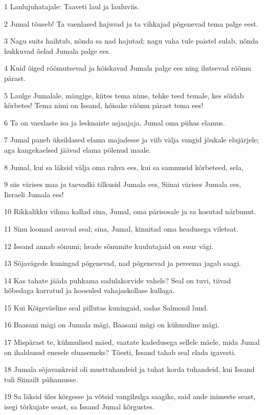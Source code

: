 \par 1 Laulujuhatajale: Taaveti laul ja lauluviis.
\par 2 Jumal tõuseb! Ta vaenlased hajuvad ja ta vihkajad põgenevad tema palge eest.
\par 3 Nagu suits haihtub, nõnda sa nad hajutad; nagu vaha tule paistel sulab, nõnda hukkuvad õelad Jumala palge ees.
\par 4 Kuid õiged rõõmutsevad ja hõiskavad Jumala palge ees ning ilutsevad rõõmu pärast.
\par 5 Laulge Jumalale, mängige, kiites tema nime, tehke teed temale, kes sõidab kõrbetes! Tema nimi on Issand, hõisake rõõmu pärast tema ees!
\par 6 Ta on vaeslaste isa ja lesknaiste asjaajaja, Jumal oma pühas elamus.
\par 7 Jumal paneb üksildased elama majadesse ja viib välja vangid jõukale elujärjele; aga kangekaelsed jäävad elama põlenud maale.
\par 8 Jumal, kui sa läksid välja oma rahva ees, kui sa sammusid kõrbeteed, sela,
\par 9 siis värises maa ja taevadki tilkusid Jumala ees, Siinai värises Jumala ees, Iisraeli Jumala ees!
\par 10 Rikkalikku vihma kallad sina, Jumal, oma pärisosale ja sa kosutad närbunut.
\par 11 Sinu loomad asuvad seal; sina, Jumal, kinnitad oma headusega viletsat.
\par 12 Issand annab sõnumi; heade sõnumite kuulutajaid on suur vägi.
\par 13 Sõjavägede kuningad põgenevad, nad põgenevad ja pereema jagab saagi.
\par 14 Kas tahate jääda puhkama sadulakorvide vahele? Seal on tuvi, tiivad hõbedaga karratud ja hoosuled vahajaskollase kullaga.
\par 15 Kui Kõigeväeline seal pillutas kuningaid, sadas Salmonil lund.
\par 16 Baasani mägi on Jumala mägi, Baasani mägi on kühmuline mägi.
\par 17 Mispärast te, kühmulised mäed, vaatate kadedusega sellele mäele, mida Jumal on ihaldanud enesele eluasemeks? Tõesti, Issand tahab seal elada igavesti.
\par 18 Jumala sõjavankreid oli musttuhandeid ja tuhat korda tuhandeid, kui Issand tuli Siinailt pühamusse.
\par 19 Sa läksid üles kõrgesse ja võtsid vangihulga saagiks, said ande inimeste seast, isegi tõrkujate seast, sa Issand Jumal kõrgustes.
